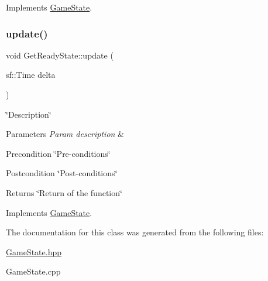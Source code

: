 Implements \hyperlink{classGameState_aa14eeaf244bcf19b7013af75cb722dde}{Game\+State}.

\mbox{\label{classGetReadyState_a412486c612eee1d8c4821706dd7b3206}} 
\subsubsection{\texorpdfstring{update()}{update()}}
{\footnotesize\ttfamily void Get\+Ready\+State\+::update (\begin{DoxyParamCaption}\item[{sf\+::\+Time}]{delta }\end{DoxyParamCaption})\hspace{0.3cm}{\ttfamily [virtual]}}



\char`\"{}\+Description\char`\"{} 


\begin{DoxyParams}{Parameters}
{\em Param description} & \\
\hline
\end{DoxyParams}
\begin{DoxyPrecond}{Precondition}
\char`\"{}\+Pre-\/conditions\char`\"{} 
\end{DoxyPrecond}
\begin{DoxyPostcond}{Postcondition}
\char`\"{}\+Post-\/conditions\char`\"{} 
\end{DoxyPostcond}
\begin{DoxyReturn}{Returns}
\char`\"{}\+Return of the function\char`\"{} 
\end{DoxyReturn}


Implements \hyperlink{classGameState_ab1fe4312f7ce88e7dc11f9935dee67d1}{Game\+State}.



The documentation for this class was generated from the following files\+:\begin{DoxyCompactItemize}
\item 
\hyperlink{GameState_8hpp}{Game\+State.\+hpp}\item 
Game\+State.\+cpp\end{DoxyCompactItemize}
